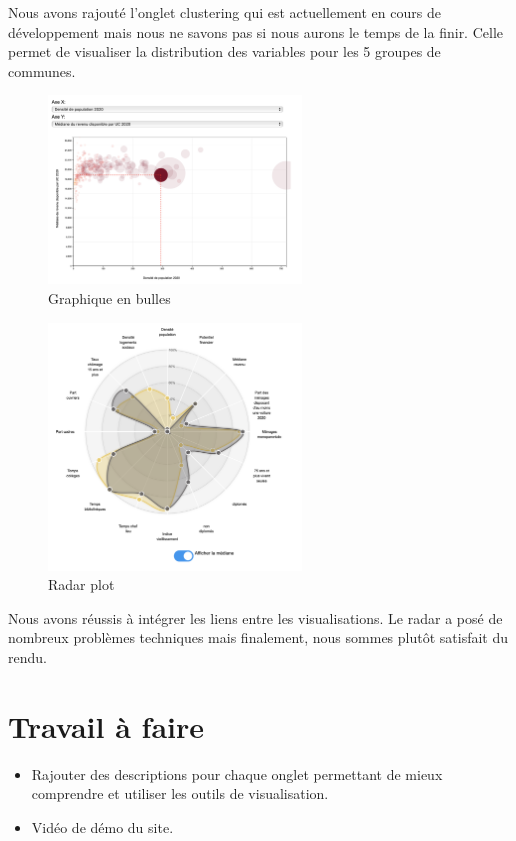 \documentclass{article}
\begin{document}
Nous avons rajouté l'onglet clustering qui est actuellement en cours de développement mais nous ne savons pas si nous aurons le temps de la finir. Celle permet de visualiser la distribution des variables pour les 5 groupes de communes. 

\begin{figure}[h]
    \centering
    \includegraphics[width=0.6\textwidth]{4.png}
    \caption{Graphique en bulles}
    \label{fig:Graphique en bulles}
\end{figure}

\begin{figure}[h]
    \centering
    \includegraphics[width=0.6\textwidth]{6.png}
    \caption{Radar plot}
    \label{fig:Radar plot}
\end{figure}

\vspace{20cm}

Nous avons réussis à intégrer les liens entre les visualisations. Le radar a posé de nombreux problèmes techniques mais finalement, nous sommes plutôt satisfait du rendu. 


\section{Travail à faire}
\begin{itemize}
    \item Rajouter des descriptions pour chaque onglet permettant de mieux comprendre et utiliser les outils de visualisation.
    \item Vidéo de démo du site.
\end{itemize} 
\end{document}
